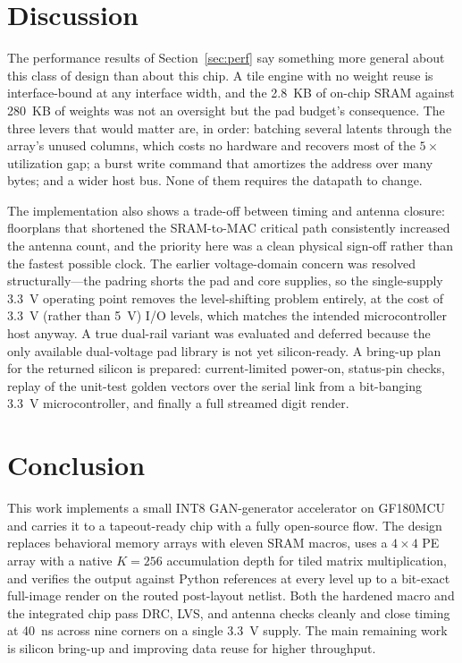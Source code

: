 \documentclass[conference,a4paper]{APSIPA2026}
\begin{document}
\section{Discussion}\label{sec:disc}
The performance results of Section~\ref{sec:perf} say something more general about this class of design than about this chip. A tile engine with no weight reuse is interface-bound at any interface width, and the 2.8~KB of on-chip SRAM against 280~KB of weights was not an oversight but the pad budget's consequence. The three levers that would matter are, in order: batching several latents through the array's unused columns, which costs no hardware and recovers most of the $5\times$ utilization gap; a burst write command that amortizes the address over many bytes; and a wider host bus. None of them requires the datapath to change.

The implementation also shows a trade-off between timing and antenna closure: floorplans that shortened the SRAM-to-MAC critical path consistently increased the antenna count, and the priority here was a clean physical sign-off rather than the fastest possible clock. The earlier voltage-domain concern was resolved structurally---the padring shorts the pad and core supplies, so the single-supply 3.3~V operating point removes the level-shifting problem entirely, at the cost of 3.3~V (rather than 5~V) I/O levels, which matches the intended microcontroller host anyway. A true dual-rail variant was evaluated and deferred because the only available dual-voltage pad library is not yet silicon-ready. A bring-up plan for the returned silicon is prepared: current-limited power-on, status-pin checks, replay of the unit-test golden vectors over the serial link from a bit-banging 3.3~V microcontroller, and finally a full streamed digit render.

\section{Conclusion}\label{sec:concl}
This work implements a small INT8 GAN-generator accelerator on GF180MCU and carries it to a tapeout-ready chip with a fully open-source flow. The design replaces behavioral memory arrays with eleven SRAM macros, uses a $4\times4$ PE array with a native $K{=}256$ accumulation depth for tiled matrix multiplication, and verifies the output against Python references at every level up to a bit-exact full-image render on the routed post-layout netlist. Both the hardened macro and the integrated chip pass DRC, LVS, and antenna checks cleanly and close timing at 40~ns across nine corners on a single 3.3~V supply. The main remaining work is silicon bring-up and improving data reuse for higher throughput.
\end{document}
